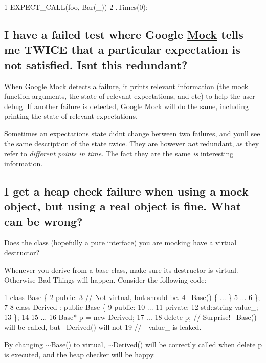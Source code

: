 \begin{DoxyCode}
1 EXPECT\_CALL(foo, Bar(\_))
2     .Times(0);
\end{DoxyCode}


\subsection*{I have a failed test where Google \hyperlink{classMock}{Mock} tells me T\+W\+I\+CE that a particular expectation is not satisfied. Isn\textquotesingle{}t this redundant?}

When Google \hyperlink{classMock}{Mock} detects a failure, it prints relevant information (the mock function arguments, the state of relevant expectations, and etc) to help the user debug. If another failure is detected, Google \hyperlink{classMock}{Mock} will do the same, including printing the state of relevant expectations.

Sometimes an expectation\textquotesingle{}s state didn\textquotesingle{}t change between two failures, and you\textquotesingle{}ll see the same description of the state twice. They are however {\itshape not} redundant, as they refer to {\itshape different points in time}. The fact they are the same {\itshape is} interesting information.

\subsection*{I get a heap check failure when using a mock object, but using a real object is fine. What can be wrong?}

Does the class (hopefully a pure interface) you are mocking have a virtual destructor?

Whenever you derive from a base class, make sure its destructor is virtual. Otherwise Bad Things will happen. Consider the following code\+:


\begin{DoxyCode}
1 class Base \{
2  public:
3   // Not virtual, but should be.
4   ~Base() \{ ... \}
5   ...
6 \};
7 
8 class Derived : public Base \{
9  public:
10   ...
11  private:
12   std::string value\_;
13 \};
14 
15 ...
16   Base* p = new Derived;
17   ...
18   delete p;  // Surprise! ~Base() will be called, but ~Derived() will not
19              // - value\_ is leaked.
\end{DoxyCode}


By changing {\ttfamily $\sim$\+Base()} to virtual, {\ttfamily $\sim$\+Derived()} will be correctly called when {\ttfamily delete p} is executed, and the heap checker will be happy.

